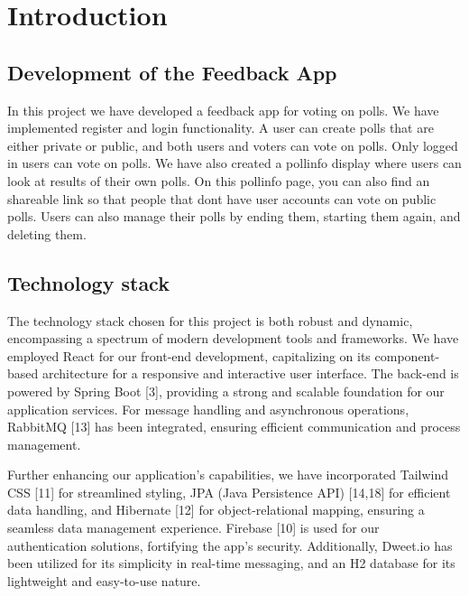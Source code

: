 \setlength{\parskip}{1em} %
\setlength{\parindent}{0pt} %

\section{Introduction}
\label{sec:introduction}

\subsection{Development of the Feedback App}
In this project we have developed a feedback app for voting on polls. We have implemented register and login functionality. A user can create polls that are either private or public, and both users and voters can vote on polls. 
Only logged in users can vote on polls. We have also created a pollinfo display where users can look at results of their own polls. On this pollinfo page, you can also find an shareable link so that people that dont have user accounts can vote on public polls. 
Users can also manage their polls by ending them, starting them again, and deleting them. 

\subsection{Technology stack}
The technology stack chosen for this project is both robust and dynamic, encompassing a spectrum of modern development tools and frameworks. 
We have employed React for our front-end development, capitalizing on its component-based architecture for a responsive and interactive user interface. 
The back-end is powered by Spring Boot [3], providing a strong and scalable foundation for our application services. For message handling and asynchronous operations, RabbitMQ [13] has been integrated, ensuring efficient communication and process management. 

Further enhancing our application's capabilities, we have incorporated Tailwind CSS [11] for streamlined styling, JPA (Java Persistence API) [14,18] for efficient data handling, and Hibernate [12] for object-relational mapping, ensuring a seamless data management experience. 
Firebase [10]  is used for our authentication solutions, fortifying the app's security. 
Additionally, Dweet.io has been utilized for its simplicity in real-time messaging, and an H2 database for its lightweight and easy-to-use nature.

